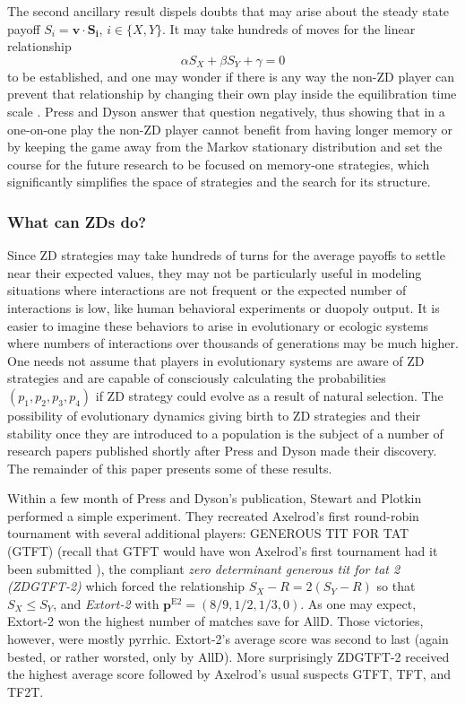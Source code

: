 The second ancillary result dispels doubts that may arise about the steady state payoff $S_i = \mathbf{v}\cdot \mathbf{S_i}$, $i \in \{X, Y\}$. It may take hundreds of moves for the linear relationship
\[
\alpha S_X + \beta S_Y + \gamma = 0
\]
to be established, and one may wonder if there is any way the non-ZD player can prevent that relationship by changing their own play inside the equilibration time scale . Press and Dyson answer that question negatively, thus showing that in a one-on-one play the non-ZD player cannot benefit from having longer memory or by keeping the game away from the Markov stationary distribution and set the course for the future research to be focused on memory-one strategies, which significantly simplifies the space of strategies and the search for its structure.

\subsubsection{What can ZDs do?}

Since ZD strategies may take hundreds of turns for the average payoffs to settle near their expected values, they may not be particularly useful in modeling situations where interactions are not frequent or the expected number of interactions is low, like human behavioral experiments or duopoly output. It is easier to imagine these behaviors to arise in evolutionary or ecologic systems where numbers of interactions over thousands of generations may be much higher. One needs not assume that players in evolutionary systems are aware of ZD strategies and are capable of consciously calculating the probabilities $(p_1, p_2, p_3, p_4)$ if ZD strategy could evolve as a result of natural selection. The possibility of evolutionary dynamics giving birth to ZD strategies and their stability once they are introduced to a population is the subject of a number of research papers published shortly after Press and Dyson made their discovery. The remainder of this paper presents some of these results.

Within a few month of Press and Dyson's publication, Stewart and Plotkin \cite{Stewart26062012} performed a simple experiment. They recreated Axelrod's first round-robin tournament with several additional players: GENEROUS TIT FOR TAT (GTFT) (recall that GTFT would have won Axelrod's first tournament had it been submitted ), the compliant \textit{zero determinant generous tit for tat 2 (ZDGTFT-2)} which forced the relationship $S_X - R = 2(S_Y - R)$ so that $S_X \leq S_Y$, and \textit{Extort-2} with $\mathbf{p}^{\textrm{E2}} = (8/9, 1/2, 1/3, 0)$. As one may expect, Extort-2 won the highest number of matches save for AllD. Those victories, however, were mostly pyrrhic. Extort-2's average score was second to last (again bested, or rather worsted, only by AllD). More surprisingly ZDGTFT-2 received the highest average score followed by Axelrod's usual suspects GTFT, TFT, and TF2T. 

